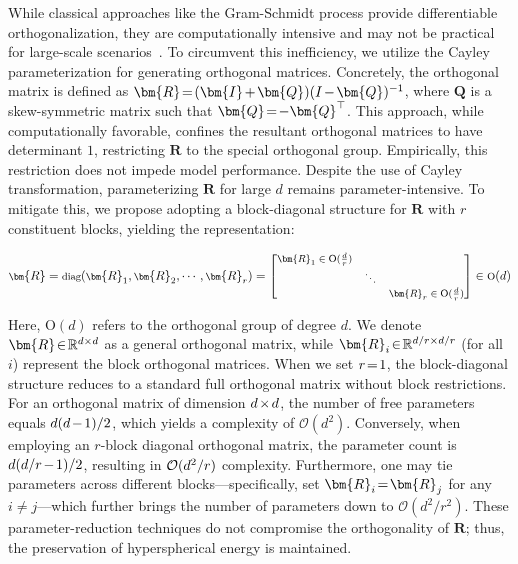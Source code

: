 While classical approaches like the Gram-Schmidt process provide differentiable orthogonalization, they are computationally intensive and may not be practical for large-scale scenarios~\cite{liu2021orthogonal}. To circumvent this inefficiency, we utilize the Cayley parameterization for generating orthogonal matrices. Concretely, the orthogonal matrix is defined as $\thickmuskip=2mu \medmuskip=2mu \bm{R}=(\bm{I}+\bm{Q})(I-\bm{Q})^{-1}$, where $\bm{Q}$ is a skew-symmetric matrix such that $\thickmuskip=2mu \medmuskip=2mu \bm{Q}=-\bm{Q}^\top$. This approach, while computationally favorable, confines the resultant orthogonal matrices to have determinant $1$, restricting $\bm{R}$ to the special orthogonal group. Empirically, this restriction does not impede model performance. Despite the use of Cayley transformation, parameterizing $\bm{R}$ for large $d$ remains parameter-intensive. To mitigate this, we propose adopting a block-diagonal structure for $\bm{R}$ with $r$ constituent blocks, yielding the representation:

\begin{equation}
    \footnotesize
    \bm{R}=\text{diag}(\bm{R}_1,\bm{R}_2,\cdots,\bm{R}_r)=\begin{bmatrix}
    \bm{R}_1\in \text{O}(\frac{d}{r}) &  &\\
    &\ddots & \\
    & & \bm{R}_r\in \text{O}(\frac{d}{r})
    \end{bmatrix}\in \text{O}(d)
\end{equation}

Here, $\text{O}(d)$ refers to the orthogonal group of degree $d$. We denote $\thickmuskip=2mu \medmuskip=2mu \bm{R}\in\mathbb{R}^{d\times d}$ as a general orthogonal matrix, while $\thickmuskip=2mu \medmuskip=2mu \bm{R}_i\in\mathbb{R}^{d/r\times d/r}$ (for all $i$) represent the block orthogonal matrices. When we set $\thickmuskip=2mu \medmuskip=2mu r=1$, the block-diagonal structure reduces to a standard full orthogonal matrix without block restrictions. For an orthogonal matrix of dimension $\thickmuskip=2mu \medmuskip=2mu d\times d$, the number of free parameters equals $\thickmuskip=2mu \medmuskip=2mu d(d-1)/2$, which yields a complexity of $\mathcal{O}(d^2)$. Conversely, when employing an $r$-block diagonal orthogonal matrix, the parameter count is $\thickmuskip=2mu \medmuskip=2mu d(d/r-1)/2$, resulting in $\thickmuskip=2mu \medmuskip=2mu \mathcal{O}(d^2/r)$ complexity. Furthermore, one may tie parameters across different blocks—specifically, set $\thickmuskip=2mu \medmuskip=2mu \bm{R}_i = \bm{R}_j$ for any $i\neq j$—which further brings the number of parameters down to $\mathcal{O}(d^2/r^2)$. These parameter-reduction techniques do not compromise the orthogonality of $\bm{R}$; thus, the preservation of hyperspherical energy is maintained.

